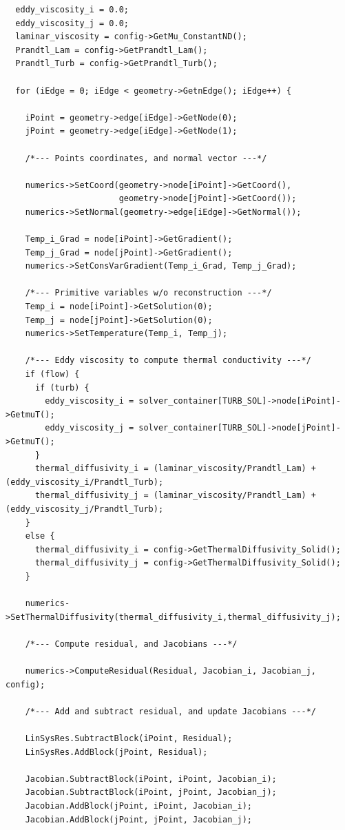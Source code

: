 \begin{lstlisting}
  eddy_viscosity_i = 0.0;
  eddy_viscosity_j = 0.0;
  laminar_viscosity = config->GetMu_ConstantND();
  Prandtl_Lam = config->GetPrandtl_Lam();
  Prandtl_Turb = config->GetPrandtl_Turb();

  for (iEdge = 0; iEdge < geometry->GetnEdge(); iEdge++) {

    iPoint = geometry->edge[iEdge]->GetNode(0);
    jPoint = geometry->edge[iEdge]->GetNode(1);

    /*--- Points coordinates, and normal vector ---*/

    numerics->SetCoord(geometry->node[iPoint]->GetCoord(),
                       geometry->node[jPoint]->GetCoord());
    numerics->SetNormal(geometry->edge[iEdge]->GetNormal());

    Temp_i_Grad = node[iPoint]->GetGradient();
    Temp_j_Grad = node[jPoint]->GetGradient();
    numerics->SetConsVarGradient(Temp_i_Grad, Temp_j_Grad);

    /*--- Primitive variables w/o reconstruction ---*/
    Temp_i = node[iPoint]->GetSolution(0);
    Temp_j = node[jPoint]->GetSolution(0);
    numerics->SetTemperature(Temp_i, Temp_j);

    /*--- Eddy viscosity to compute thermal conductivity ---*/
    if (flow) {
      if (turb) {
        eddy_viscosity_i = solver_container[TURB_SOL]->node[iPoint]->GetmuT();
        eddy_viscosity_j = solver_container[TURB_SOL]->node[jPoint]->GetmuT();
      }
      thermal_diffusivity_i = (laminar_viscosity/Prandtl_Lam) + (eddy_viscosity_i/Prandtl_Turb);
      thermal_diffusivity_j = (laminar_viscosity/Prandtl_Lam) + (eddy_viscosity_j/Prandtl_Turb);
    }
    else {
      thermal_diffusivity_i = config->GetThermalDiffusivity_Solid();
      thermal_diffusivity_j = config->GetThermalDiffusivity_Solid();
    }

    numerics->SetThermalDiffusivity(thermal_diffusivity_i,thermal_diffusivity_j);

    /*--- Compute residual, and Jacobians ---*/

    numerics->ComputeResidual(Residual, Jacobian_i, Jacobian_j, config);

    /*--- Add and subtract residual, and update Jacobians ---*/

    LinSysRes.SubtractBlock(iPoint, Residual);
    LinSysRes.AddBlock(jPoint, Residual);

    Jacobian.SubtractBlock(iPoint, iPoint, Jacobian_i);
    Jacobian.SubtractBlock(iPoint, jPoint, Jacobian_j);
    Jacobian.AddBlock(jPoint, iPoint, Jacobian_i);
    Jacobian.AddBlock(jPoint, jPoint, Jacobian_j);
\end{lstlisting}


